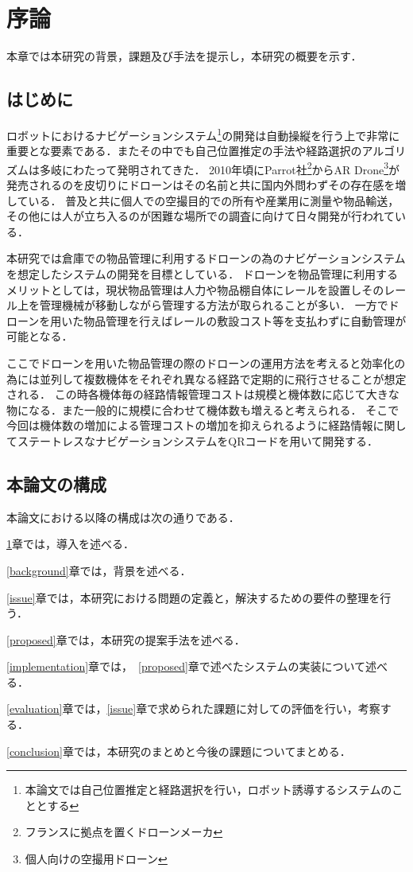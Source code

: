 \chapter{序論}
\label{introduction}

本章では本研究の背景，課題及び手法を提示し，本研究の概要を示す．

\section{はじめに}
ロボットにおけるナビゲーションシステム\footnote{本論文では自己位置推定と経路選択を行い，ロボット誘導するシステムのこととする}の開発は自動操縦を行う上で非常に重要とな要素である．またその中でも自己位置推定の手法や経路選択のアルゴリズムは多岐にわたって発明されてきた．
2010年頃にParrot社\footnote{フランスに拠点を置くドローンメーカ}からAR Drone\footnote{個人向けの空撮用ドローン}が発売されるのを皮切りにドローンはその名前と共に国内外問わずその存在感を増している．
普及と共に個人での空撮目的での所有や産業用に測量や物品輸送，その他には人が立ち入るのが困難な場所での調査に向けて日々開発が行われている．

本研究では倉庫での物品管理に利用するドローンの為のナビゲーションシステムを想定したシステムの開発を目標としている．
ドローンを物品管理に利用するメリットとしては，現状物品管理は人力や物品棚自体にレールを設置しそのレール上を管理機械が移動しながら管理する方法が取られることが多い．
一方でドローンを用いた物品管理を行えばレールの敷設コスト等を支払わずに自動管理が可能となる．

ここでドローンを用いた物品管理の際のドローンの運用方法を考えると効率化の為には並列して複数機体をそれぞれ異なる経路で定期的に飛行させることが想定される．
この時各機体毎の経路情報管理コストは規模と機体数に応じて大きな物になる．また一般的に規模に合わせて機体数も増えると考えられる．
そこで今回は機体数の増加による管理コストの増加を抑えられるように経路情報に関してステートレスなナビゲーションシステムをQRコードを用いて開発する．

\section{本論文の構成}

本論文における以降の構成は次の通りである．

\ref{introduction}章では，導入を述べる．

\ref{background}章では，背景を述べる．

\ref{issue}章では，本研究における問題の定義と，解決するための要件の整理を行う．

\ref{proposed}章では，本研究の提案手法を述べる．

\ref{implementation}章では，~\ref{proposed}章で述べたシステムの実装について述べる．

\ref{evaluation}章では，\ref{issue}章で求められた課題に対しての評価を行い，考察する．

\ref{conclusion}章では，本研究のまとめと今後の課題についてまとめる．


